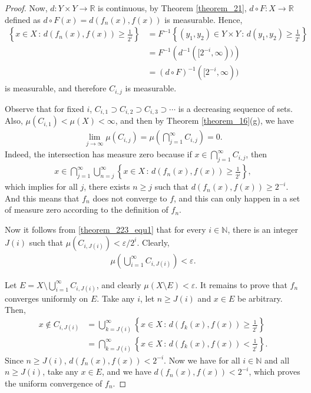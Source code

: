 \documentclass[11pt]{book}
\theoremstyle{definition}
\numberwithin{equation}{chapter}
\begin{document}
\begin{proof}
Now, $d: Y \times Y \to \mathbb{R}$ is continuous, by Theorem \ref{theorem_21}, $d \circ F: X \to \mathbb{R}$ defined as $d\circ F(x) = d(f_n(x),f(x))$ is measurable. Hence,
\begin{align*}
    \left\{x \in X \,:\, d(f_n(x),f(x)) \geq \frac{1}{2^i}\right\} & = F^{-1} \left\{(y_1,y_2) \in Y \times Y \,:\, d(y_1,y_2) \geq \frac{1}{2^i}\right\} \\
    & = F^{-1} \left(d^{-1}([2^{-i},\infty))\right) \\
    & = (d \circ F)^{-1} ([2^{-i},\infty))
\end{align*}
is measurable, and therefore $C_{i,j}$ is measurable. 

Observe that for fixed $i$, $C_{i,1} \supset C_{i,2} \supset C_{i,3} \supset \cdots$ is a decreasing sequence of sets. Also, $\mu(C_{i,1}) < \mu(X) < \infty$, and then by Theorem \ref{theorem_16}(g), we have
\begin{align}\label{theorem_223_equ1}
    \lim_{j\to\infty} \mu\left(C_{i,j}\right) = \mu \left(\bigcap^\infty_{j=1} C_{i,j}\right) = 0.
\end{align}
Indeed, the intersection has measure zero because if $x \in \bigcap^\infty_{j=1} C_{i,j}$, then
\begin{align*}
    x \in \bigcap^\infty_{j=1} \bigcup^\infty_{n=j} \left\{x \in X \,:\, d(f_n(x),f(x)) \geq \frac{1}{2^i}\right\},
\end{align*}
which implies for all $j$, there exists $n \geq j$ such that $d(f_n(x),f(x)) \geq 2^{-i}$. And this means that $f_n$ does not converge to $f$, and this can only happen in a set of measure zero according to the definition of $f_n$.

Now it follows from \eqref{theorem_223_equ1} that for every $i \in \mathbb{N}$, there is an integer $J(i)$ such that $\mu(C_{i,J(i)}) < \varepsilon/2^i$. Clearly, 
\begin{align*}
    \mu\left(\bigcup^\infty_{i=1} C_{i,J(i)}\right) < \varepsilon.
\end{align*}

Let $E = X \setminus \bigcup^\infty_{i=1} C_{i,J(i)}$, and clearly $\mu(X \setminus E) < \varepsilon$. It remains to prove that $f_n$ converges uniformly on $E$. Take any $i$, let $n \geq J(i)$ and $x \in E$ be arbitrary. Then, 
\begin{align*}
    x \notin C_{i,J(i)} & = \bigcup^\infty_{k=J(i)} \left\{x \in X \,:\, d(f_k(x),f(x)) \geq \frac{1}{2^i} \right\} \\
    & = \bigcap^\infty_{k=J(i)} \left\{x \in X \,:\, d(f_k(x),f(x)) < \frac{1}{2^i} \right\}.
\end{align*}
Since $n \geq J(i)$, $d(f_n(x),f(x)) < 2^{-i}$. Now we have for all $i \in \mathbb{N}$ and all $n \geq J(i)$, take any $x \in E$, and we have $d(f_n(x),f(x)) < 2^{-i}$, which proves the uniform convergence of $f_n$.
\end{proof}
\end{document}
